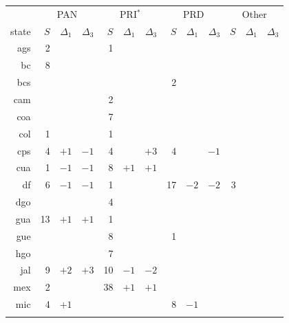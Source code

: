 \documentclass[letter,12pt]{article}
\begin{document}
\begin{table}
\begin{center}
\begin{tabular}{rrrr|rrr|rrr|rrr}
      & \multicolumn{3}{c}{PAN} & \multicolumn{3}{c}{PRI$^*$} & \multicolumn{3}{c}{PRD} & \multicolumn{3}{c}{Other} \\
state &$S$& $\Delta_1$ &  $\Delta_3$ & $S$& $\Delta_1$ &  $\Delta_3$ & $S$& $\Delta_1$ &  $\Delta_3$ & $S$& $\Delta_1$ &  $\Delta_3$ \\ \hline
ags &   2 &     &     &   1 &     &     &     &     &      &    &    & \\       
 bc &   8 &     &     &     &     &     &     &     &      &    &    & \\       
bcs &     &     &     &     &     &     &   2 &     &      &    &    & \\       
cam &     &     &     &   2 &     &     &     &     &      &    &    & \\       \hdashline
coa &     &     &     &   7 &     &     &     &     &      &    &    & \\       
col &   1 &     &     &   1 &     &     &     &     &      &    &    & \\       
cps &   4 & $+1$& $-1$&   4 &     & $+3$&   4 &     & $-1$ &    &    & \\       
cua &   1 & $-1$& $-1$&   8 & $+1$& $+1$&     &     &      &    &    & \\       \hdashline
 df &   6 & $-1$& $-1$&   1 &     &     &  17 & $-2$& $-2$ & 3  &    & \\       
dgo &     &     &     &   4 &     &     &     &     &      &    &    & \\       
gua &  13 & $+1$& $+1$&   1 &     &     &     &     &      &    &    & \\       
gue &     &     &     &   8 &     &     &   1 &     &      &    &    & \\       \hdashline
hgo &     &     &     &   7 &     &     &     &     &      &    &    & \\       
jal &   9 & $+2$& $+3$&  10 & $-1$& $-2$&     &     &      &    &    & \\       
mex &   2 &     &     &  38 & $+1$& $+1$&     &     &      &    &    & \\       
mic &   4 & $+1$&     &     &     &     &   8 & $-1$&      &    &    & \\      \hdashline 

\end{tabular}
\end{center}
\end{table}
\end{document}
